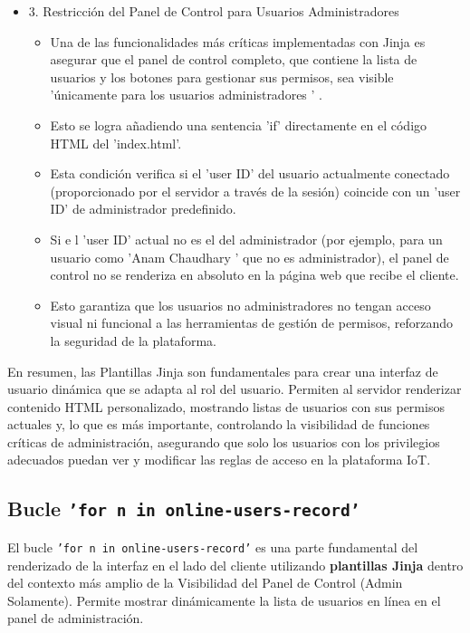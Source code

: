 \documentclass{report}
\begin{document}
\begin{itemize}
    \item 3. Restricción del Panel de Control para Usuarios Administradores
    \begin{itemize}
        \item Una de las funcionalidades más críticas implementadas con Jinja es asegurar que  el panel de control completo, que contiene la lista de 
        usuarios y los botones para gestionar sus permisos, sea visible  'únicamente para los usuarios administradores ' .
        \item Esto se logra añadiendo una  sentencia 'if' directamente en el código HTML  del 'index.html'.
        \item Esta condición verifica si el 'user ID' del usuario actualmente conectado (proporcionado por el servidor a través de la sesión) coincide 
        con un 'user ID' de administrador predefinido.
        \item Si e    l 'user ID' actual no es el del administrador (por ejemplo, para un usuario como  'Anam Chaudhary ' que no es administrador), el
         panel de control  no se renderiza en absoluto  en la página web que recibe el cliente.
        \item Esto garantiza que los usuarios no administradores no tengan acceso visual ni funcional a las herramientas de gestión de permisos, 
        reforzando la seguridad de la plataforma.
    \end{itemize}
\end{itemize}

En resumen, las Plantillas Jinja son fundamentales para crear una interfaz de usuario dinámica que se adapta al rol del usuario. Permiten al servidor 
renderizar contenido HTML personalizado, mostrando listas de usuarios con sus permisos actuales y, lo que es más importante, controlando la visibilidad 
de funciones críticas de administración, asegurando que solo los usuarios con los privilegios adecuados puedan ver y modificar las reglas de acceso en 
la plataforma IoT.

\subsection{Bucle \texttt{'for n in online-users-record'}}
El bucle \texttt{'for n in online-users-record'} es una parte fundamental del renderizado de la interfaz en el lado del cliente utilizando 
\textbf{plantillas Jinja} dentro del contexto más amplio de la Visibilidad del Panel de Control (Admin Solamente). Permite mostrar dinámicamente 
la lista de usuarios en línea en el panel de administración.
\end{document}
